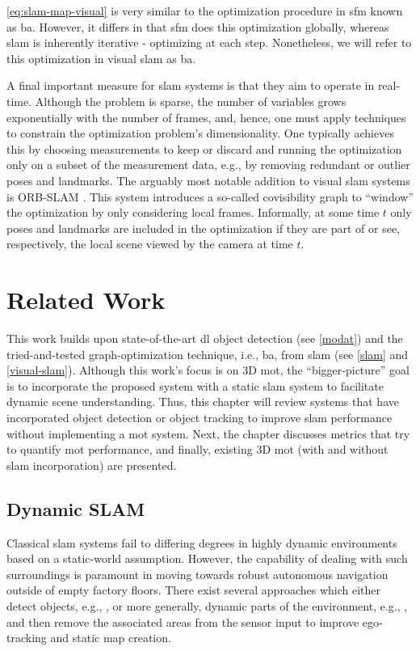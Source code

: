 \documentclass[headsepline, hidelinks, footsepline, footinclude=false, oneside, fontsize=11pt, paper=a4, listof=totoc, bibliography=totoc]{scrbook}
\begin{document}
\cref{eq:slam-map-visual} is very similar to the optimization procedure in \gls{sfm} known as \gls{ba}. However, it differs in that \gls{sfm} does this optimization globally, whereas \gls{slam} is inherently iterative - optimizing at each step.
Nonetheless, we will refer to this optimization in visual \gls{slam} as \gls{ba}.


A final important measure for \gls{slam} systems is that they aim to operate in real-time. Although the problem is sparse, the number of variables grows exponentially with the number of frames, and, hence, 
one must apply techniques to constrain the optimization problem's dimensionality.
One typically achieves this by choosing measurements to keep or discard and running the optimization only on a subset of the measurement data, e.g., by removing redundant or outlier poses and landmarks.
The arguably most notable addition to visual \gls{slam} systems is ORB-SLAM \cite{mur-artalORBSLAMVersatileAccurate2015a,mur-artalORBSLAM2OpenSourceSLAM2017}.
This system introduces a so-called covisibility graph to ``window'' the optimization by only considering local frames.
Informally, at some time \(t\) only poses and landmarks are included in the optimization if they are part of or see, respectively, the local scene viewed by the camera at time \(t\).

\chapter{Related Work \label{related-work}}
\label{sec:orgfc14dd9}
  This work builds upon state-of-the-art \gls{dl} object detection (see \cref{modat}) and the tried-and-tested graph-optimization technique, i.e., \gls{ba}, from \gls{slam} (see \cref{slam} and \cref{visual-slam}).
Although this work's focus is on 3D \gls{mot}, the ``bigger-picture'' goal is to incorporate the proposed system with a static \gls{slam} system to facilitate dynamic scene understanding.
Thus, this chapter will review systems that have incorporated object detection or object tracking to improve \gls{slam} performance without implementing a \gls{mot} system.
Next, the chapter discusses metrics that try to quantify \gls{mot} performance, and finally, existing 3D \gls{mot} (with and without \gls{slam} incorporation) are presented.


\section{Dynamic SLAM \label{dynamic-slam}}
\label{sec:org5a49cdd}
   Classical \gls{slam} systems fail to differing degrees in highly dynamic environments based on a static-world assumption. However, the capability of dealing with such surroundings is paramount in moving towards robust autonomous navigation outside of empty factory floors. 
There exist several approaches which either detect objects, e.g., \cite{yuDSSLAMSemanticVisual2018,bescosDynaSLAMTrackingMapping2018,salas-morenoSLAMSimultaneousLocalisation2013}, or more generally, 
dynamic parts of the environment, e.g., \cite{liRGBDSLAMDynamic2017}, and then remove the associated areas from the sensor input to improve ego-tracking and static map creation.
\end{document}
